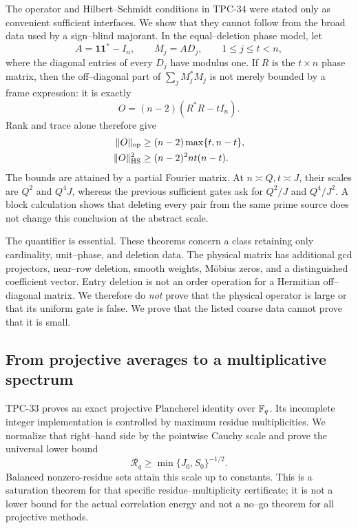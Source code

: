 The operator and Hilbert--Schmidt conditions in TPC-34 were stated only as
convenient sufficient interfaces.  We show that they cannot follow from
the broad data used by a sign--blind majorant.  In the equal--deletion
phase model, let
\[
 A=\mathbf1\mathbf1^*-I_n,\qquad
 M_j=AD_j,\qquad 1\le j\le t<n,
\]
where the diagonal entries of every \(D_j\) have modulus one.  If \(R\)
is the \(t\times n\) phase matrix, then the off--diagonal part of
\(\sum_jM_j^*M_j\) is not merely bounded by a frame expression: it is
exactly
\begin{equation}
 O=(n-2)(R^*R-tI_n).
 \label{eq:tpc35-intro-exact-O}
\end{equation}
Rank and trace alone therefore give
\begin{align}
 \|O\|_{\operatorname{op}}
 &\ge(n-2)\max\{t,n-t\},
 \label{eq:tpc35-intro-op-lower}\\
 \|O\|_{\operatorname{HS}}^2
 &\ge(n-2)^2nt(n-t).
 \label{eq:tpc35-intro-hs-lower}
\end{align}
The bounds are attained by a partial Fourier matrix.  At
\(n\asymp Q,t\asymp J\), their scales are \(Q^2\) and \(Q^4J\), whereas
the previous sufficient gates ask for \(Q^2/J\) and \(Q^4/J^2\).
A block calculation shows that deleting every pair from the same prime
source does not change this conclusion at the abstract scale.

The quantifier is essential.  These theorems concern a class retaining
only cardinality, unit--phase, and deletion data.  The physical matrix has
additional gcd projectors, near--row deletion, smooth weights, M\"obius
zeros, and a distinguished coefficient vector.  Entry deletion is not an
order operation for a Hermitian off--diagonal matrix.  We therefore do
\emph{not} prove that the physical operator is large or that its uniform
gate is false.  We prove that the listed coarse data cannot prove that it
is small.

\subsection{From projective averages to a multiplicative spectrum}

TPC-33 proves an exact projective Plancherel identity over
\(\mathbb F_q\).  Its incomplete integer implementation is controlled by maximum
residue multiplicities.  We normalize that right--hand side by the
pointwise Cauchy scale and prove the universal lower bound
\begin{equation}
 \mathscr R_q\ge\min\{J_0,S_0\}^{-1/2}.
 \label{eq:tpc35-intro-projective-saturation}
\end{equation}
Balanced nonzero-residue sets attain this scale up to constants.  This is
a saturation theorem for that specific
residue--multiplicity certificate; it is not a lower bound for the actual
correlation energy and not a no--go theorem for all projective methods.

